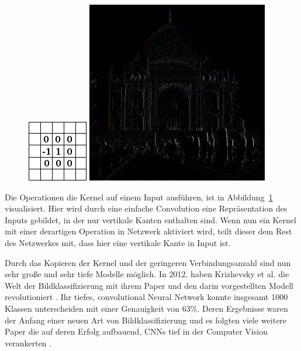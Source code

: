 \documentclass[pdftex,a4paper,halfparskip, article]{scrartcl}
\begin{document}
\begin{figure}
\centering
\begin{minipage}{.5\textwidth}
  \centering
  \includegraphics[width=.3\linewidth]{gimp_doku_edges_kernel}
\end{minipage}%
\begin{minipage}{.5\textwidth}
  \centering
  \includegraphics[width=.8\linewidth]{gimp_doku_edges}
  \end{minipage}
  \label{fig:kernel}
\end{figure}

Die Operationen die Kernel auf einem Input ausführen, ist in Abbildung~\ref{fig:kernel} visualisiert. Hier wird durch eine einfache Convolution eine Repräsentation des Inputs gebildet, in der nur vertikale Kanten enthalten sind. Wenn nun ein Kernel mit einer derartigen Operation in Netzwerk aktiviert wird, teilt dieser dem Rest des Netzwerkes mit, dass hier eine vertikale Kante in Input ist.

Durch das Kopieren der Kernel und der geringeren Verbindungsanzahl sind nun sehr große und sehr tiefe Modelle möglich. In 2012, haben Krizhevsky et al. die Welt der Bildklassifizierung mit ihrem Paper und den darin vorgestellten Modell revolutioniert \cite{ImageNetOriginal}. Ihr tiefes, convolutional Neural Network konnte insgesamt 1000 Klassen unterscheiden mit einer Genauigkeit von 63\%. Deren Ergebnisse waren der Anfang einer neuen Art von Bildklassifizierung und es folgten viele weitere Paper die auf deren Erfolg aufbauend, CNNs tief in der Computer Vision verankerten \cite{colahsBlogCnn}.
\end{document}
